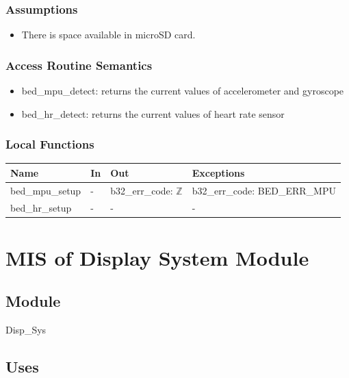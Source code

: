 \documentclass[12pt, titlepage]{article}
\begin{document}
\subsubsection{Assumptions}

\begin{itemize}
\item There is space available in microSD card.
\end{itemize}

\subsubsection{Access Routine Semantics}
\begin{itemize}
\item bed\_mpu\_detect: returns the current values of accelerometer and gyroscope
\item bed\_hr\_detect: returns the current values of heart rate sensor
\end{itemize}
\subsubsection{Local Functions}

\begin{center}
\begin{tabular}{p{4cm} p{1cm} p{4cm} p{4cm}}
\hline
\textbf{Name} & \textbf{In} & \textbf{Out} & \textbf{Exceptions} \\
\hline
bed\_mpu\_setup & - & b32\_err\_code: $\mathbb{Z}$ & b32\_err\_code: BED\_ERR\_MPU\\
bed\_hr\_setup & - & - & -\\
\hline
\end{tabular}
\end{center}


\newpage



\section{MIS of Display System Module} \label{mDS_2} 

\subsection{Module}

Disp\_Sys

\subsection{Uses}
\end{document}
